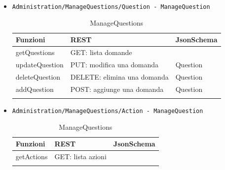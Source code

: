 \documentclass[../DefinizioneDiProdotto_v2.0.0.tex]{subfiles}
\begin{document}
\begin{itemize}
	\item \texttt{Administration/ManageQuestions/Question - ManageQuestion}
	      \begin{longtable}[c] { >{\centering\arraybackslash}p{3cm} >{\centering\arraybackslash}p{6cm} >{\centering\arraybackslash}p{3cm}}
	      	\toprule
	      	\centerline{\textbf{Funzioni}} & \centerline{\textbf{REST}}  & \centerline{\textbf{JsonSchema}} \\
	      	\midrule
	      	getQuestions                   & GET: lista domande          &                                  \\
	      	\addlinespace[0.3em]
	      	\midrule
	      	\addlinespace[0.3em]
	      	updateQuestion                 & PUT: modifica una domanda   & Question                         \\
	      	\addlinespace[0.3em]
	      	\midrule
	      	\addlinespace[0.3em]
	      	deleteQuestion                 & DELETE: elimina una domanda & Question                         \\
	      	\addlinespace[0.3em]
	      	\midrule
	      	\addlinespace[0.3em]
	      	addQuestion                    & POST: aggiunge una domanda  & Question                         \\

	      	\bottomrule
	      	\caption{ManageQuestions}
	      \end{longtable}

	\item \texttt{Administration/ManageQuestions/Action - ManageQuestion}
	      \begin{longtable}[c] { >{\centering\arraybackslash}p{3cm} >{\centering\arraybackslash}p{6cm} >{\centering\arraybackslash}p{3cm}}
	      	\toprule
	      	\centerline{\textbf{Funzioni}} & \centerline{\textbf{REST}} & \centerline{\textbf{JsonSchema}} \\
	      	\midrule
	      	getActions                     & GET: lista azioni          &                                  \\
	      	\bottomrule
	      	\caption{ManageQuestions}
	      \end{longtable}


\end{itemize}
\end{document}
